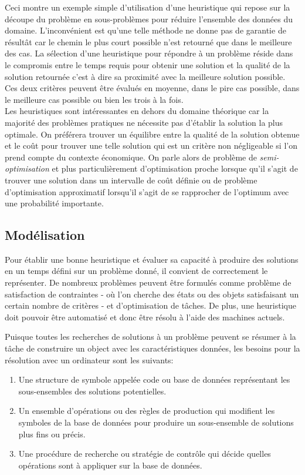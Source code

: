 Ceci montre un exemple simple d'utilisation d'une heuristique qui repose sur la découpe du problème en sous-problèmes pour réduire l'ensemble des données du domaine. L'inconvénient est qu'une telle méthode ne donne pas de garantie de résultât car le chemin le plus court possible n'est retourné que dans le meilleure des cas.
La sélection d'une heuristique pour répondre à un problème réside dans le compromis entre le temps requis pour obtenir une solution et la qualité de la solution retournée c'est à dire sa proximité avec la meilleure solution possible. 
Ces deux critères peuvent être évalués en moyenne, dans le pire cas possible, dans le meilleure cas possible ou bien les trois à la fois. \\

Les heuristiques sont intéressantes en dehors du domaine théorique car la majorité des problèmes pratiques ne nécessite pas d'établir la solution la plus optimale. On préférera trouver un équilibre entre la qualité de la solution obtenue et le coût pour trouver une telle solution qui est un critère non négligeable si l'on prend compte du contexte économique. On parle alors de problème de \textit{semi-optimisation} et plus particulièrement d'optimisation proche lorsque qu'il s'agit de trouver une solution dans un intervalle de coût définie ou de problème d'optimisation approximatif lorsqu'il s'agit de se rapprocher de l'optimum avec une probabilité importante.


\subsection{Modélisation}
Pour établir une bonne heuristique et évaluer sa capacité à produire des solutions en un temps défini sur un problème donné, il convient de correctement le représenter.
De nombreux problèmes peuvent être formulés comme problème de satisfaction de contraintes - où l'on cherche des états ou des objets satisfaisant un certain nombre de critères - et d'optimisation de tâches. De plus, une heuristique doit pouvoir être automatisé et donc être résolu à l'aide des machines actuels.

Puisque toutes les recherches de solutions à un problème peuvent se résumer à la tâche de construire un object avec les caractéristiques données, les besoins\cite{judea-pearl-heuristics} pour la résolution avec un ordinateur sont les suivants:

\begin{enumerate}
\item Une structure de symbole appelée code ou base de données représentant les sous-ensembles des solutions potentielles.
\item Un ensemble d'opérations ou des règles de production qui modifient les symboles de la base de données pour produire un sous-ensemble de solutions plus fins ou précis.
\item Une procédure de recherche ou stratégie de contrôle qui décide quelles opérations sont à appliquer sur la base de données.
\end{enumerate}

